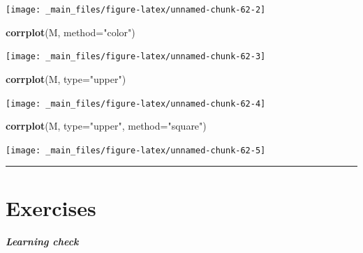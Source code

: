 \documentclass[
]{book}
\newenvironment{Shaded}{\begin{snugshade}}{\end{snugshade}}
\newcommand{\DataTypeTok}[1]{\textcolor[rgb]{0.13,0.29,0.53}{#1}}
\newcommand{\KeywordTok}[1]{\textcolor[rgb]{0.13,0.29,0.53}{\textbf{#1}}}
\newcommand{\NormalTok}[1]{#1}
\newcommand{\StringTok}[1]{\textcolor[rgb]{0.31,0.60,0.02}{#1}}
\begin{document}
\begin{center}\texttt{[image: \_main\_files/figure-latex/unnamed-chunk-62-2]} \end{center}

\begin{Shaded}
\begin{Highlighting}[]
\KeywordTok{corrplot}\NormalTok{(M, }\DataTypeTok{method=}\StringTok{"color"}\NormalTok{)}
\end{Highlighting}
\end{Shaded}

\begin{center}\texttt{[image: \_main\_files/figure-latex/unnamed-chunk-62-3]} \end{center}

\begin{Shaded}
\begin{Highlighting}[]
\KeywordTok{corrplot}\NormalTok{(M, }\DataTypeTok{type=}\StringTok{"upper"}\NormalTok{)}
\end{Highlighting}
\end{Shaded}

\begin{center}\texttt{[image: \_main\_files/figure-latex/unnamed-chunk-62-4]} \end{center}

\begin{Shaded}
\begin{Highlighting}[]
\KeywordTok{corrplot}\NormalTok{(M, }\DataTypeTok{type=}\StringTok{"upper"}\NormalTok{, }\DataTypeTok{method=}\StringTok{"square"}\NormalTok{)}
\end{Highlighting}
\end{Shaded}

\begin{center}\texttt{[image: \_main\_files/figure-latex/unnamed-chunk-62-5]} \end{center}

\begin{center}\rule{0.5\linewidth}{0.5pt}\end{center}

\hypertarget{exercises}{%
\section{Exercises}\label{exercises}}

\begin{learncheck}
\textbf{\emph{Learning check}}
\end{learncheck}
\end{document}
